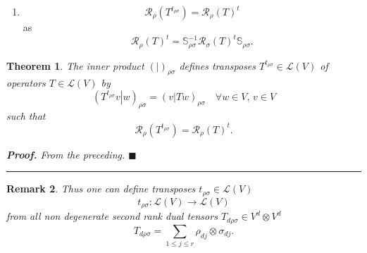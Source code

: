\documentclass[aps,preprint]{revtex4}
\newtheorem{theorem}{Theorem}
\newtheorem{remark}[theorem]{Remark}
\newenvironment{proof}[1][Proof]{\noindent\textbf{#1.} }{\ \rule{0.5em}{0.5em}}
\begin{document}
\begin{enumerate}
\item 
\begin{equation}
\mathcal{R}_{\rho }\left( T^{t_{\rho \sigma }}\right) =\mathcal{R}_{\rho
}\left( T\right) ^{t}
\end{equation}%
as 
\begin{equation}
\mathcal{R}_{\rho }\left( T\right) ^{t}=\mathbb{S}_{\rho \sigma }^{-1}%
\mathcal{R}_{\sigma }\left( T\right) ^{t}\mathbb{S}_{\rho \sigma }.
\end{equation}
\end{enumerate}

\begin{theorem}
The inner product $\left( \left. {}\right\vert \right) _{\rho \sigma }$
defines transposes $T^{t_{\rho \sigma }}\in \mathcal{L}\left( V\right) $ of
operators $T\in \mathcal{L}\left( V\right) $ by 
\begin{equation}
\left( \left. T^{t_{\rho \sigma }}v\right\vert w\right) _{\rho \sigma
}=\left( \left. v\right\vert Tw\right) _{\rho \sigma }\quad \forall w\in
V,\,v\in V
\end{equation}%
such that 
\begin{equation}
\mathcal{R}_{\rho }\left( T^{t_{\rho \sigma }}\right) =\mathcal{R}_{\rho
}\left( T\right) ^{t}.
\end{equation}

\begin{proof}
From the preceding. $\blacksquare $
\end{proof}
\end{theorem}

\begin{remark}
Thus one can define \emph{transposes }$t_{\rho \sigma }\in \mathcal{L}\left(
V\right) $ 
\begin{equation}
t_{\rho \sigma }:\mathcal{L}\left( V\right) \rightarrow \mathcal{L}\left(
V\right)
\end{equation}%
from all non degenerate second rank dual tensors $T_{d\rho \sigma }\in
V^{d}\otimes V^{d}$%
\begin{equation}
T_{d\rho \sigma }=\sum_{1\leq j\leq r}\rho _{dj}\otimes \sigma _{dj}.
\end{equation}
\end{remark}
\end{document}
